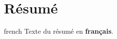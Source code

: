 \chapter*{Résumé}                      %

\begin{otherlanguage*}{french}
  Texte du résumé en \textbf{français}.
\end{otherlanguage*}
